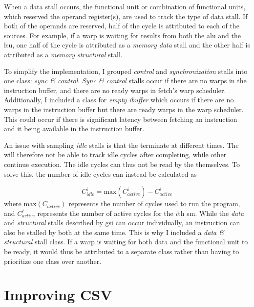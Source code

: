When a data stall occurs, the functional unit or combination of functional units, which reserved the operand register(s), are used to track the type of data stall. If both of the operands are reserved, half of the cycle is attributed to each of the sources. For example, if a warp is waiting for results from both the \acrshort{alu} and the \acrshort{lsu}, one half of the cycle is attributed as a \textit{memory data} stall and the other half is attributed as a \textit{memory structural} stall. 

To simplify the implementation, I grouped \textit{control} and \textit{synchronization} stalls into one class: \textit{sync \& control}. \textit{Sync \& control} stalls occur if there are no warps in the instruction buffer, and there are no ready warps in fetch's warp scheduler. Additionally, I included a class for \textit{empty ibuffer} which occurs if there are no warps in the instruction buffer but there are ready warps in the warp scheduler. This could occur if there is significant latency between fetching an instruction and it being available in the instruction buffer.

An issue with sampling \textit{idle} stalls is that the  terminate at different times. The  will therefore not be able to track idle cycles after completing, while other  continue execution. The idle cycles can thus not be read by the  themselves. To solve this, the number of idle cycles can instead be calculated as

\begin{equation} \label{eq:idle}
    C^i_{idle} = \textrm{max}(C^i_{active}) - C^i_{active}
\end{equation}
\noindent
where $\textrm{max}(C_{active})$ represents the number of cycles used to run the program, and $C^i_{active}$ represents the number of active cycles for the $i$th \acrshort{sm}.
\newpage
While the \textit{data} and \textit{structural} stalls described by \acrshort{gsi} can occur individually, an instruction can also be stalled by both at the same time. This is why I included a \textit{data \& structural} stall class. If a warp is waiting for both data and the functional unit to be ready, it would thus be attributed to a separate class rather than having to prioritize one class over another.

\section{Improving CSV} \label{sec:improve_csv}

